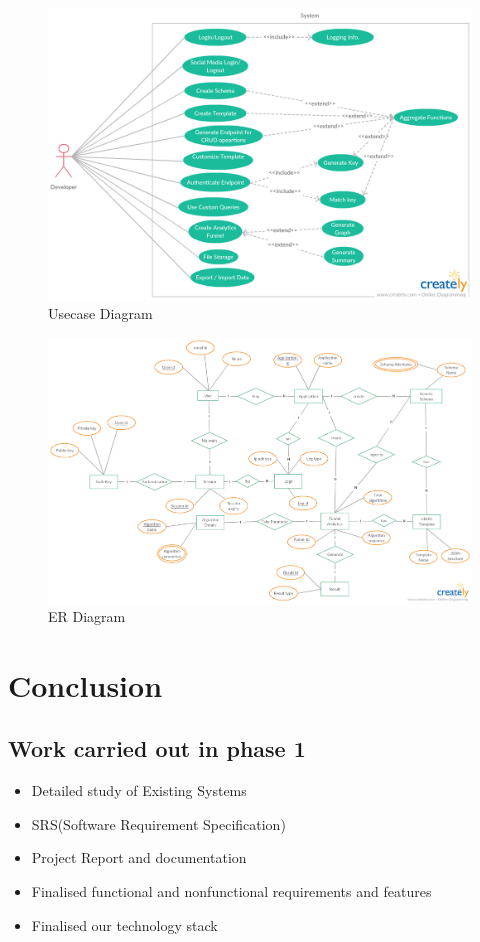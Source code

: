 \documentclass[a4paper,12pt]{report}
\begin{document}
    \newpage          
    \begin{figure}[h]
      \includegraphics[width=1\textwidth]{usecase.png}
      \caption{ Usecase Diagram}  
    \end{figure}
	\newpage
	\begin{figure}[h]
      \includegraphics[width=8.5in ,angle=90]{ER.jpg}
      \caption{ ER Diagram}  
    \end{figure}

    \chapter {Conclusion}
    \section{Work carried out in phase 1}
    \begin{itemize}
      \item  Detailed study of Existing Systems
      \item  SRS(Software Requirement Specification)
      \item  Project Report and documentation
      \item  Finalised functional and nonfunctional requirements and features
      \item  Finalised our technology stack
    \end{itemize}
\end{document}
